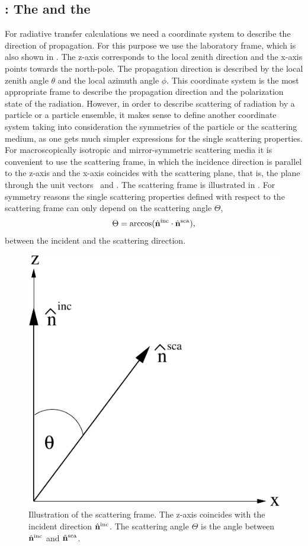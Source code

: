 \subsection[Coordinate systems]{: The
   and the  }
\label{sec:clouds:coordinate_sytems}

For radiative transfer calculations we need a coordinate system to
describe the direction of propagation. For this purpose we use the
laboratory frame, which is also shown in
.  The z-axis corresponds to the
local zenith direction and the x-axis points towards the
north-pole. The propagation direction is described by the local zenith
angle $\theta$ and the local azimuth angle $\phi$.  This coordinate
system is the most appropriate frame to describe the propagation
direction and the polarization state of the radiation.  However, in
order to describe scattering of radiation by a particle or a particle
ensemble, it makes sense to define another coordinate system taking
into consideration the symmetries of the particle or the scattering
medium, as one gets much simpler expressions for the single scattering
properties.  For macroscopically isotropic and mirror-symmetric
scattering media it is convenient to use the scattering frame, in
which the incidence direction is parallel to the z-axis and the x-axis
coincides with the scattering plane, that is, the plane through the
unit vectors \ and . The
scattering frame is illustrated in
. For symmetry reasons the single
scattering properties defined with respect to the scattering frame can
only depend on the scattering angle $\Theta$,
\begin{equation}
  \label{eq:scat_angle}
  \Theta=\arccos(\hat{{\bf n}}^{\mathrm{inc}} \cdot {\hat{\ensuremath{{\bf n}}}^{\mathrm{sca}}}),
\end{equation}
between the incident and the scattering direction.

\begin{figure}[htbp]
 \begin{center}
   \includegraphics*[width=0.4\hsize]{part_frame}
   \caption{Illustration of the scattering frame. The z-axis coincides with the incident direction $\hat{{\bf n}}^{\mathrm{inc}}$. The scattering angle $\Theta$ is the angle between  $\hat{{\bf n}}^{\mathrm{inc}}$ and $\hat{{\bf n}}^{\mathrm{sca}}$.}
   \label{fig:scattering:part_frame}  
 \end{center}
\end{figure}

